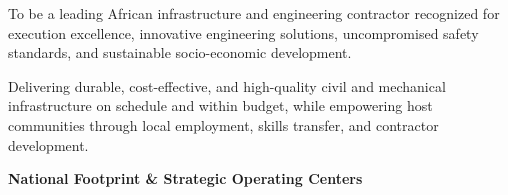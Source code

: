 \documentclass[a4paper,11pt]{article}
\begin{document}
\noindent
\begin{minipage}[t]{0.485\textwidth}
    \begin{tcolorbox}[
        enhanced, colback=white, colframe=mhlightgray, boxrule=0.8pt, arc=4pt,
        title={\bfseries\color{white}\faEye\ Our Vision},
        colbacktitle=mhnavy, fonttitle=\bfseries\small,
        left=8pt, right=8pt, top=8pt, bottom=8pt,
        drop shadow=black!4
    ]
        {\fontsize{8.6pt}{12.2pt}\selectfont\color{mhtext}
        To be a leading African infrastructure and engineering contractor recognized for execution excellence, innovative engineering solutions, uncompromised safety standards, and sustainable socio-economic development.
        }
    \end{tcolorbox}
\end{minipage}
\hfill
\begin{minipage}[t]{0.485\textwidth}
    \begin{tcolorbox}[
        enhanced, colback=white, colframe=mhlightgray, boxrule=0.8pt, arc=4pt,
        title={\bfseries\color{white}\faBullseye\ Our Mission},
        colbacktitle=mhblue, fonttitle=\bfseries\small,
        left=8pt, right=8pt, top=8pt, bottom=8pt,
        drop shadow=black!4
    ]
        {\fontsize{8.6pt}{12.2pt}\selectfont\color{mhtext}
        Delivering durable, cost-effective, and high-quality civil and mechanical infrastructure on schedule and within budget, while empowering host communities through local employment, skills transfer, and contractor development.
        }
    \end{tcolorbox}
\end{minipage}

\vfill

{\large\bfseries\color{mhnavy} National Footprint \& Strategic Operating Centers}
\vspace{0.10cm}
\end{document}

